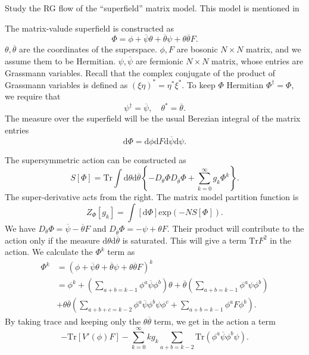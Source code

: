 Study the RG flow of the ``superfield'' matrix model.
This model is mentioned in

The matrix-valude superfield is constructed as
\begin{equation}
\Phi = \phi + \overline{\psi} \theta + \overline{\theta} \psi + \theta \overline{\theta} F.	
\end{equation}
$\theta,\overline{\theta}$ are the coordinates of the superspace.
$\phi,F$ are bosonic $N\times N$ matrix, and we assume them to be Hermitian.
$\psi,\overline{\psi}$ are fermionic $N\times N$ matrix, whose entries are Grassmann variables.
Recall that the complex conjugate of the product of Grassmann variables is defined as $ (\xi \eta)^* = \eta^* \xi^*$.
To keep $\Phi$ Hermitian $\Phi^\dagger = \Phi$, we require that
\[
	\psi^\dagger  = \overline{\psi},\quad \theta^* = \overline{\theta}
.\] 
The measure over the superfield will be the usual Berezian integral of the matrix entries
\begin{equation}
\mathrm{d}\Phi = \mathrm{d}\phi \mathrm{d}F \mathrm{d}\overline{\psi} \mathrm{d}\psi.	
\end{equation}

The supersymmetric action can be constructed as
\begin{equation}
	S[\Phi] =\mathrm{Tr} \int \mathrm{d}\theta \mathrm{d}\overline{\theta}
	\left\{ - D_\theta \Phi D_{\overline{\theta}} \Phi + \sum_{k=0}^\infty g_k \Phi^k \right\}.
\end{equation}
The super-derivative acts from the right.
The matrix model partition function is
\begin{equation}
	Z_\Phi [g_k] = \int [\mathrm{d}\Phi] \mathrm{exp} \left( - N S[\Phi] \right) 	.
\end{equation}
We have $D_\theta \Phi = \overline{\psi} - \overline{\theta} F$ and $D_{\overline{\theta}} \Phi = -\psi + \theta F$.
Their product will contribute to the action only if the measure $\mathrm{d}\theta \mathrm{d}\overline{\theta}$ is saturated.
This will give a term $\mathrm{Tr}F^2$ in the action.
We calculate the $\Phi^k$ term as
\begin{align*}
	\Phi^k &= \left( \phi + \overline{\psi}\theta + \overline{\theta} \psi + \theta \overline{\theta} F \right)^k \\
		   &= \phi^k + \left( \sum_{a+b=k-1} \phi^a \overline{\psi} \phi^b \right) \theta + \overline{\theta} \left( \sum_{a+b=k-1} \phi^a \psi \phi^b\right)  \\
		   &+ \theta \overline{\theta}\left(\sum_{a+b+c=k-2} \phi^a \overline{\psi} \phi^b \psi \phi^c + \sum_{a+b=k-1}\phi^a F \phi^b\right).
\end{align*}
By taking trace and keeping only the $\theta \overline{\theta}$ term, we get in the action a term
\[
	- \mathrm{Tr}[V'(\phi) F] - \sum_{k=0}^\infty k g_k \sum_{a+b=k-2} \mathrm{Tr}(\phi^a \overline{\psi} \phi^b \psi)
.\] 


